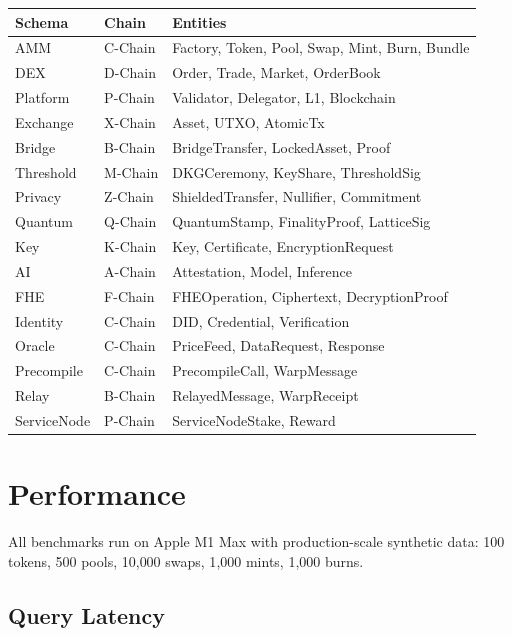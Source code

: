 \documentclass[11pt,a4paper]{article}
\begin{document}
\begin{table}[H]
\centering
\begin{tabularx}{\textwidth}{llX}
\toprule
\textbf{Schema} & \textbf{Chain} & \textbf{Entities} \\
\midrule
AMM & C-Chain & Factory, Token, Pool, Swap, Mint, Burn, Bundle \\
DEX & D-Chain & Order, Trade, Market, OrderBook \\
Platform & P-Chain & Validator, Delegator, L1, Blockchain \\ %
Exchange & X-Chain & Asset, UTXO, AtomicTx \\
Bridge & B-Chain & BridgeTransfer, LockedAsset, Proof \\
Threshold & M-Chain & DKGCeremony, KeyShare, ThresholdSig \\
Privacy & Z-Chain & ShieldedTransfer, Nullifier, Commitment \\
Quantum & Q-Chain & QuantumStamp, FinalityProof, LatticeSig \\
Key & K-Chain & Key, Certificate, EncryptionRequest \\
AI & A-Chain & Attestation, Model, Inference \\
FHE & F-Chain & FHEOperation, Ciphertext, DecryptionProof \\
Identity & C-Chain & DID, Credential, Verification \\
Oracle & C-Chain & PriceFeed, DataRequest, Response \\
Precompile & C-Chain & PrecompileCall, WarpMessage \\
Relay & B-Chain & RelayedMessage, WarpReceipt \\
ServiceNode & P-Chain & ServiceNodeStake, Reward \\
\bottomrule
\end{tabularx}
\end{table}

\section{Performance}

All benchmarks run on Apple M1 Max with production-scale synthetic data:
100 tokens, 500 pools, 10{,}000 swaps, 1{,}000 mints, 1{,}000 burns.

\subsection{Query Latency}
\end{document}
